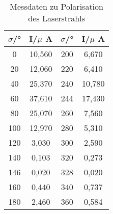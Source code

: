 \begin{table}[h!]
  \centering
  \caption{Messdaten zu Polarisation des Laserstrahls}
  \label{tab:polarisation}
  \begin{tabular}{c c c c}
    \toprule
      $\sigma$/° & I/$\mu$ A & $\sigma$/° & I/$\mu$ A \\
      \midrule
        0 & 10,560 &   200 &  6,670 \\
       20 & 12,060 &   220 &  6,410 \\
       40 & 25,370 &   240 & 10,780 \\
       60 & 37,610 &   244 & 17,430 \\
       80 & 25,070 &   260 &  7,560 \\
      100 & 12,970 &   280 &  5,310 \\
      120 &  3,030 &   300 &  2,590 \\
      140 &  0,103 &   320 &  0,273 \\
      146 &  0,020 &   328 &  0,020 \\
      160 &  0,440 &   340 &  0,737 \\
      180 &  2,460 &   360 &  0,584 \\
    \bottomrule
  \end{tabular}
\end{table}

%

